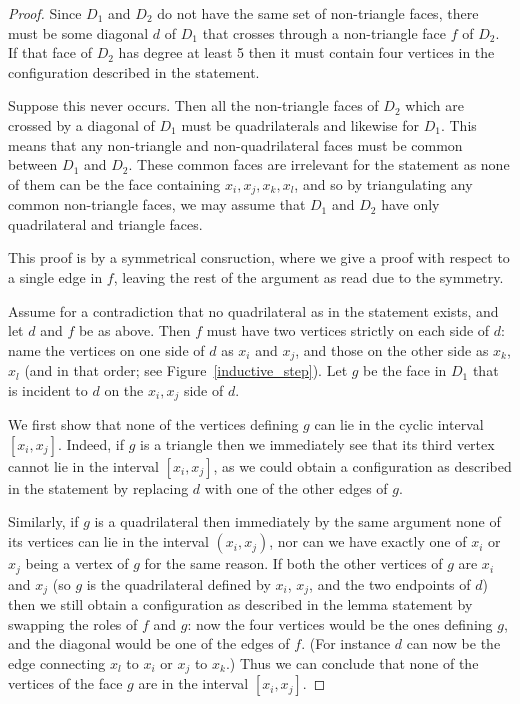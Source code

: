 \documentclass[11pt]{article}
\theoremstyle{remark}
\theoremstyle{definition}
\begin{document}
\begin{proof}
  Since $D_1$ and $D_2$ do not have the same set of non-triangle faces, there must be some diagonal $d$ of $D_1$ that crosses through a non-triangle face $f$ of $D_2$.  If that face of $D_2$ has degree at least 5 then it must contain four vertices in the configuration described in the statement.

Suppose this never occurs.  Then all the non-triangle faces of $D_2$ which are crossed by a diagonal of $D_1$ must be quadrilaterals and likewise for $D_1$.  This means that any non-triangle and non-quadrilateral faces must be common between $D_1$ and $D_2$.  These common faces are irrelevant for the statement as none of them can be the face containing $x_i, x_j, x_k, x_l$, and so by triangulating any common non-triangle faces, we may assume that $D_1$ and $D_2$ have only quadrilateral and triangle faces.

This proof is by a symmetrical consruction, where we give a proof with respect to a single edge in $f$, leaving the rest of the argument as read due to the symmetry.

Assume for a contradiction that no quadrilateral as in the statement exists, and let $d$ and $f$ be as above.  Then $f$ must have two vertices strictly on each side of $d$: name the vertices on one side of $d$ as $x_i$ and $x_j$, and those on the other side as $x_k$, $x_l$ (and in that order; see Figure~\ref{inductive_step}).  Let $g$ be the face in $D_1$ that is incident to $d$ on the $x_i, x_j$ side of $d$.

We first show that none of the vertices defining $g$ can lie in the cyclic interval $[x_i,x_j]$. Indeed, if $g$ is a triangle then we immediately see that its third vertex cannot lie in the interval $[x_i,x_j]$, as we could obtain a configuration as described in the statement by replacing $d$ with one of the other edges of $g$.

Similarly, if $g$ is a quadrilateral then immediately by the same argument none of its vertices can lie in the interval $(x_i, x_j)$, nor can we have exactly one of $x_i$ or $x_j$ being a vertex of $g$ for the same reason. If both the other vertices of $g$ are $x_i$ and $x_j$ (so $g$ is the quadrilateral defined by $x_i$, $x_j$, and the two endpoints of $d$) then we still obtain a configuration as described in the lemma statement by swapping the roles of $f$ and $g$: now the four vertices would be the ones defining $g$, and the diagonal would be one of the edges of $f$. (For instance $d$ can now be the edge connecting $x_l$ to $x_i$ or $x_j$ to $x_k$.) Thus we can conclude that none of the vertices of the face $g$ are in the interval $[x_i, x_j]$.  


\end{proof}
\end{document}
